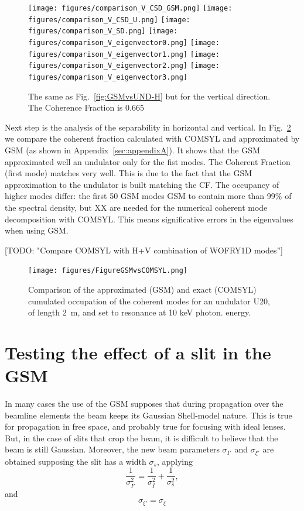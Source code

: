 \documentclass{iucr}              %
\newcommand{\todo}[1]{{\color{red}[TODO: "#1'']}}
\begin{document}
\begin{figure}
    \centering
    \texttt{[image: figures/comparison\_V\_CSD\_GSM.png]}
    \texttt{[image: figures/comparison\_V\_CSD\_U.png]}
    \texttt{[image: figures/comparison\_V\_SD.png]}
    \texttt{[image: figures/comparison\_V\_eigenvector0.png]}
    \texttt{[image: figures/comparison\_V\_eigenvector1.png]}
    \texttt{[image: figures/comparison\_V\_eigenvector2.png]}
    \texttt{[image: figures/comparison\_V\_eigenvector3.png]}
        
    \caption{The same as Fig.~\ref{fig:GSMvsUND-H} but for the vertical direction. The Coherence Fraction is 0.665}
    \label{fig:GSMvsUND-V}
\end{figure}



Next step is the analysis of the separability in horizontal and vertical. In Fig.~\ref{fig:GSMvsCOMSYL} we compare the coherent fraction calculated with COMSYL \cite{comsyl} and approximated by GSM (as shown in Appendix~\ref{sec:appendixA}). It shows that the GSM approximated well an undulator only for the fist modes. The Coherent Fraction (first mode) matches very well. This is due to the fact that the GSM approximation to the undulator is built matching the CF. The occupancy of higher modes differ: the first 50 GSM modes GSM to contain more than 99\% of the spectral density, but XX are needed for the numerical coherent mode decomposition with COMSYL. This means significative errors in the eigenvalues when using GSM. 

\todo{Compare COMSYL with H+V combination of WOFRY1D modes}


\begin{figure}
    \centering
    \texttt{[image: figures/FigureGSMvsCOMSYL.png]}
    \caption{Comparison of the approximated (GSM) and exact (COMSYL) cumulated occupation of the coherent modes for an undulator U20, of length \SI{2}{\meter}, and set to resonance at 10 keV photon. energy.}
    \label{fig:GSMvsCOMSYL}
\end{figure}

\section{Testing the effect of a slit in the GSM}
\label{appendix:slit}

In many cases the use of the GSM supposes that during propagation over the beamline elements the beam keeps its Gaussian Shell-model nature. This is true for propagation in free space, and probably true for focusing with ideal lenses. But, in the case of slits that crop the beam, it is difficult to believe that the beam is still Gaussian. Moreover, the new beam parameters $\sigma_{I'}$ and $\sigma_{\xi'}$ are obtained supposing the slit has a width $\sigma_s$, applying
\begin{equation}
    \frac{1}{\sigma_{I'}^2} = 
    \frac{1}{\sigma_{I}^2} +
    \frac{1}{\sigma_{s}^2},
\end{equation}
and
\begin{equation}
    \sigma_{\xi'} = \sigma_{\xi} 
\end{equation}
\end{document}
